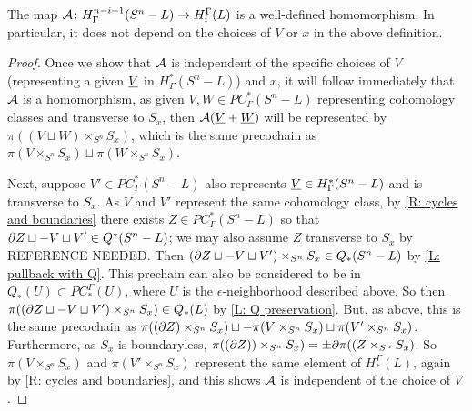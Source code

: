 \begin{proposition}
	The map $\mathcal{A} \colon H^{n-i-1}_\Gamma(S^n-L) \to H_i^\Gamma(L)$ is a well-defined homomorphism.
	In particular, it does not depend on the choices of $V$ or $x$ in the above definition.
\end{proposition}
\begin{proof}
	Once we show that $\mathcal{A}$ is independent of the specific choices of $V$ (representing a given $\underline{V}$ in $H^*_\Gamma(S^n-L)$) and $x$, it will follow immediately that $\mathcal{A}$ is a homomorphism, as given $V,W\in PC^*_\Gamma(S^n-L)$ representing cohomology classes and transverse to $S_x$, then $\mathcal{A}(\underline{V} + \underline{W})$ will be represented by $\pi((V \sqcup W) \times_{S^n} S_x)$, which is the same precochain as $\pi(V \times_{S^n} S_x) \sqcup \pi(W \times_{S^n} S_x)$.

	Next, suppose $V' \in PC^*_\Gamma(S^n-L)$ also represents $\underline{V} \in H^*_\Gamma(S^n-L)$ and is transverse to $S_x$.
	As $V$ and $V'$ represent the same cohomology class, by \cref{R: cycles and boundaries} there exists $Z \in PC^*_\Gamma(S^n-L)$ so that $\partial Z\sqcup -V \sqcup V' \in Q^*(S^n-L)$; we may also assume $Z$ transverse to $S_x$ by REFERENCE NEEDED.
	Then $(\partial Z \sqcup -V \sqcup V') \times_{S^n} S_x \in Q_*(S^n-L)$ by \cref{L: pullback with Q}.
	This prechain can also be considered to be in $Q_*(U) \subset PC_*^\Gamma(U)$, where $U$ is the $\epsilon$-neighborhood described above.
	So then $\pi((\partial Z \sqcup -V \sqcup V') \times_{S^n} S_x ) \in Q_*(L)$ by \cref{L: Q preservation}.
	But, as above, this is the same precochain as $\pi((\partial Z) \times_{S^n} S_x ) \sqcup -\pi(V \times_{S^n} S_x) \sqcup \pi(V' \times_{S^n} S_x)$.
	Furthermore, as $S_x$ is boundaryless, $\pi((\partial Z)) \times_{S^n} S_x) = \pm \partial \pi((Z \times_{S^n} S_x)$.
	So $\pi(V \times_{S^n} S_x)$ and $\pi(V' \times_{S^n} S_x)$ represent the same element of $H_*^\Gamma(L)$, again by \cref{R: cycles and boundaries}, and this shows $\mathcal{A}$ is independent of the choice of $V$.


\end{proof}
